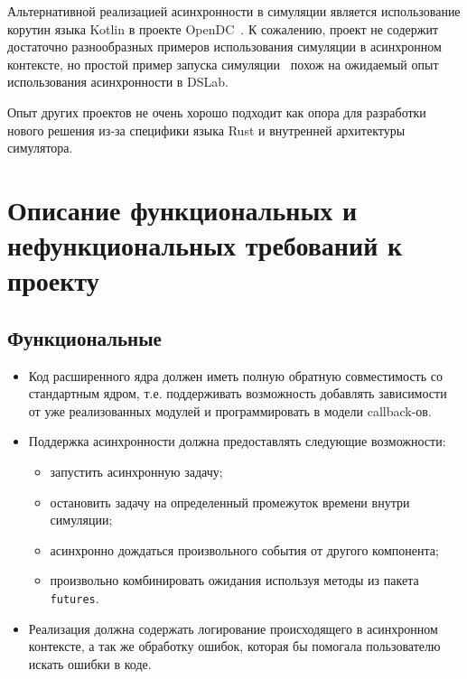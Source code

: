 Альтернативной реализацией асинхронности в симуляции является использование корутин языка Kotlin в проекте OpenDC~\cite{opendc-repo}\cite{opendc-article}. К сожалению, проект не содержит достаточно разнообразных примеров использования симуляции в асинхронном контексте, но простой пример запуска симуляции~\cite{opendc-example} похож на ожидаемый опыт использования асинхронности в DSLab.


Опыт других проектов не очень хорошо подходит как опора для разработки нового решения из-за специфики языка Rust и внутренней архитектуры симулятора.

\section{Описание функциональных и нефункциональных требований к проекту}\label{requirements}

\subsection{Функциональные}
\begin{itemize}
    \item Код расширенного ядра должен иметь полную обратную совместимость со стандартным ядром, т.е. поддерживать возможность добавлять зависимости от уже реализованных модулей и программировать в модели callback-ов.
    \item Поддержка асинхронности должна предоставлять следующие возможности:
    \begin{itemize}
        \item запустить асинхронную задачу;
        \item остановить задачу на определенный промежуток времени внутри симуляции;
        \item асинхронно дождаться произвольного события от другого компонента;
        \item произвольно комбинировать ожидания используя методы из пакета \texttt{futures}\cite{rust-futures}.
    \end{itemize}
    \item Реализация должна содержать логирование происходящего в асинхронном контексте, а так же обработку ошибок, которая бы помогала пользователю искать ошибки в коде. 
\end{itemize}


